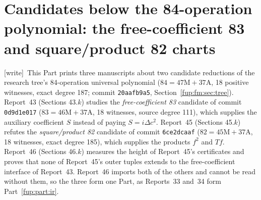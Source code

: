 \documentclass[11pt,letterpaper]{article}
\newcommand{\fupR}{0}
\renewcommand{\thesection}{\fupR.\arabic{section}}
\renewcommand{\theHsection}{\fupR.\arabic{section}}
\newcommand{\fupstart}[2]{%
  \renewcommand{\fupR}{#1}\setcounter{section}{0}\setcounter{equation}{0}%
  \renewcommand{\thesection}{\fupR.\arabic{section}}%
  \renewcommand{\theHsection}{\fupR.\arabic{section}}%
  \renewcommand{\fuphead}{#2}}
\newcommand{\fuphead}{Front matter}
\theoremstyle{definition}\newtheorem{definition}[theorem]{Definition}
\theoremstyle{remark}\newtheorem{remark}[theorem]{Remark}
\newcommand{\wtag}{\textup{[write]}}
\begin{document}
\clearpage
\fupstart{43}{Part VIII: Report 43}
\part{Candidates below the 84-operation polynomial: the free-coefficient 83 and square/product 82 charts}\label{fup:part:cand}
\noindent\wtag\ This Part prints three manuscripts about two candidate reductions of the research tree's 84-operation universal polynomial ($84=47\mathrm M+37\mathrm A$, 18 positive witnesses, exact degree 187; commit \texttt{20aafb9a5}, Section~\ref{fup:fm:sec:tree}). Report~43 (Sections 43.$k$) studies the \emph{free-coefficient 83} candidate of commit \texttt{0d9d1e017} ($83=46\mathrm M+37\mathrm A$, 18 witnesses, source degree 111), which supplies the auxiliary coefficient $S$ instead of paying $S=i\Delta c^2$. Report~45 (Sections 45.$k$) refutes the \emph{square/product 82} candidate of commit \texttt{6ce2dcaaf} ($82=45\mathrm M+37\mathrm A$, 18 witnesses, exact degree 185), which supplies the products $f^2$ and $Tf$. Report~46 (Sections 46.$k$) measures the height of Report~45's certificates and proves that none of Report~45's outer tuples extends to the free-coefficient interface of Report~43. Report~46 imports both of the others and cannot be read without them, so the three form one Part, as Reports~33 and~34 form Part~\ref{fup:part:ir}.
\end{document}
